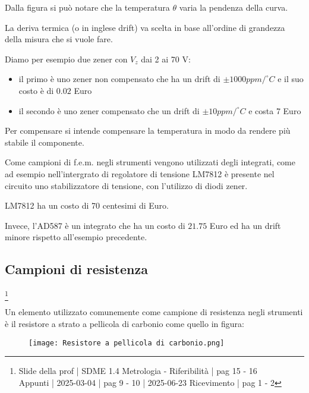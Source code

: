 \newpage 

Dalla figura si può notare che la temperatura $\theta$ varia la pendenza della curva. \newline

La deriva termica (o in inglese drift) va scelta in base all'ordine di grandezza della misura che si vuole fare. \newline 

Diamo per esempio due zener con $V_z$ dai 2 ai 70 V: 

\begin{itemize}
    \item il primo è uno zener non compensato che ha un drift di $\pm 1000 ppm/^{\circ} C$ e il suo costo è di $0.02$ Euro 
    \item il secondo è uno zener compensato che un drift di $\pm 10 ppm/^{\circ} C$ e costa 7 Euro
\end{itemize}

Per compensare si intende compensare la temperatura in modo da rendere più stabile il componente. \newline 

Come campioni di f.e.m. negli strumenti vengono utilizzati degli integrati, 
come ad esempio nell'intergrato di regolatore di tensione LM7812 è presente nel circuito uno 
stabilizzatore di tensione, con l'utilizzo di diodi zener. \newline 

LM7812 ha un costo di 70 centesimi di Euro. \newline 

Invece, l'AD587 è un integrato che ha un costo di $21.75$ Euro ed ha un drift minore rispetto all'esempio precedente. \newline 

\newpage 

\subsection{Campioni di resistenza} 
\footnote{Slide della prof | SDME 1.4 Metrologia - Riferibilità | pag 15 - 16 \\  
Appunti | 2025-03-04 | pag 9 - 10 | 2025-06-23 Ricevimento | pag 1 - 2}

Un elemento utilizzato comunemente come campione di resistenza negli strumenti è il resistore a strato a pellicola di carbonio 
come quello in figura: 

\begin{figure}[h]
    \centering
    \texttt{[image: Resistore a pellicola di carbonio.png]}
\end{figure}

